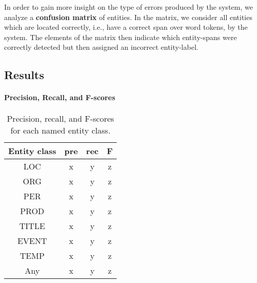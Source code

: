 \documentclass[11pt]{article}
\begin{document}
In order to gain more insight on the type of errors produced by the system, we analyze a \textbf{confusion matrix} of entities. In the matrix, we consider all entities which are located correctly, i.e., have a correct span over word tokens, by the system. The elements of the matrix then indicate which entity-spans were correctly detected but then assigned an incorrect entity-label. 




\subsection{Results}
\label{sec: results}


\paragraph{Precision, Recall, and F-scores}

\begin{table}[t!]
\begin{center}
\begin{tabular}{cccc} 
Entity class & pre & rec & F \\
\hline
\noalign{\smallskip}
LOC  & x & y & z  \\
ORG  & x & y & z  \\
PER  & x & y & z  \\
PROD  & x & y & z  \\
TITLE  & x & y & z  \\
EVENT  & x & y & z  \\
TEMP  & x & y & z  \\
\hline
\noalign{\smallskip}
Any & x & y & z  \\
\end{tabular}
\end{center}
\caption{Precision, recall, and F-scores for each named entity class.}
\label{tab: precision recall and f-scores}
\end{table}
\end{document}
